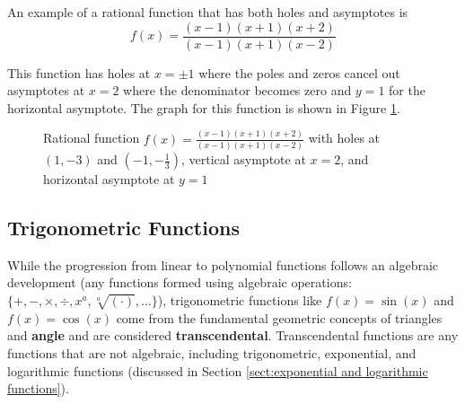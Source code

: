 \begin{example} An example of a rational function that has both holes and asymptotes is
    $$
    f(x) = \frac{(x-1)(x+1)(x+2)}{(x-1)(x+1)(x-2)}
    $$

    \noindent This function has holes at $x = \pm 1$ where the poles and zeros cancel out asymptotes at $x = 2$ where the denominator becomes zero and $y = 1$ for the horizontal asymptote. The graph for this function is shown in Figure \ref{fig:rationalholeandasymptote}.

    \begin{figure}[!ht]
        \centering
        \caption{Rational function $f(x) = \frac{(x-1)(x+1)(x+2)}{(x-1)(x+1)(x-2)}$ with holes at $(1,-3)$ and $(-1,-\frac{1}{3})$, vertical asymptote at $x=2$, and horizontal asymptote at $y=1$}
        \label{fig:rationalholeandasymptote}
    \end{figure}
\end{example}

\subsection{Trigonometric Functions}\label{sect:trigonometric functions}

While the progression from linear to polynomial functions follows an algebraic development (any functions formed using algebraic operations: $\{+,-,\times,\div,x^a,\sqrt[a]{(\cdot)},\dots\}$), trigonometric functions like $f(x) = \sin(x)$ and $f(x) = \cos(x)$ come from the fundamental geometric concepts of triangles and \textbf{angle} and are considered \textbf{transcendental}. Transcendental functions are any functions that are not algebraic, including trigonometric, exponential, and logarithmic functions (discussed in Section \ref{sect:exponential and logarithmic functions}).

